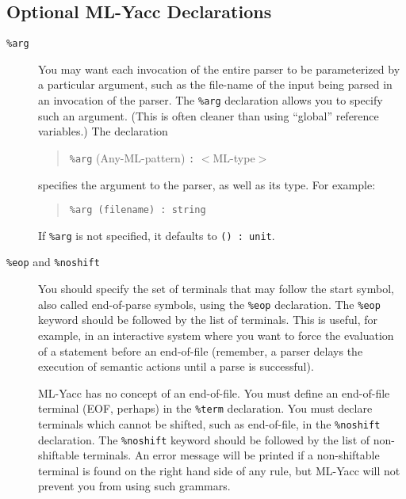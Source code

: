 \documentclass{article}
\begin{document}
\subsection{Optional ML-Yacc Declarations}
\label{optional-def}
\begin{description}
\item[{\tt \%arg}]
You may want each invocation of the entire parser to be parameterized
by a particular argument, such as the file-name of the input
being parsed in an invocation of the parser.  The {\tt \%arg} declaration
allows you to specify such an argument.
(This is often cleaner than using ``global'' reference variables.)
The declaration
\begin{quote}

        {\tt \%arg} (Any-ML-pattern) {\tt :} $<$ML-type$>$

\end{quote}
specifies the argument to the parser, as well as its type.  For example:
\begin{quote}

        {\tt \%arg (filename) : string}

\end{quote}

If {\tt \%arg} is not specified, it defaults to {\tt () : unit}.
\item[{\tt \%eop} and {\tt \%noshift}]
You should specify the set of
terminals that may follow the start
symbol, also called end-of-parse symbols, using the {\tt \%eop}
declaration.  The {\tt \%eop} keyword should be followed by the list of
terminals.  This is useful, for example, in an interactive system
where you want to force the evaluation of a statement before an
end-of-file (remember, a parser delays the execution of semantic
actions until a parse is successful).

ML-Yacc has no concept of an end-of-file.  You must
define an end-of-file terminal (EOF, perhaps) in the 
{\tt \%term} declaration.
You must declare terminals which cannot be shifted, such as 
end-of-file, in the {\tt \%noshift} declaration.  The
{\tt \%noshift} keyword should be followed by the list of non-shiftable
terminals. An error message will be printed if a non-shiftable terminal
is found on the right hand side of any rule, but ML-Yacc will not prevent
you from using such grammars.


\end{description}
\end{document}
